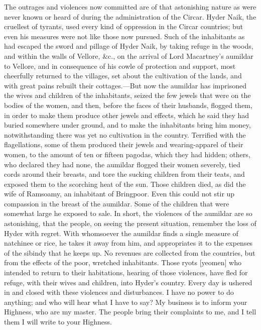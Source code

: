 The outrages and violences now committed are of that astonishing nature as were never known or heard of during the administration of the Circar. Hyder Naik, the cruellest of tyrants, used every kind of oppression in the Circar countries; but even his measures were not like those now pursued. Such of the inhabitants as had escaped the sword and pillage of Hyder Naik, by taking refuge in the woods, and within the walls of Vellore, \&c., on the arrival of Lord Macartney's aumildar to Vellore, and in consequence of his cowle of protection and support, most cheerfully returned to the villages, set about the cultivation of the lands, and with great pains rebuilt their cottages.—But now the aumildar has imprisoned the wives and children of the inhabitants, seized the few jewels that were on the bodies of the women, and then, before the faces of their husbands, flogged them, in order to make them produce other jewels and effects, which he said they had buried somewhere under ground, and to make the inhabitants bring him money, notwithstanding there was yet no cultivation in the country. Terrified with the flagellations, some of them produced their jewels and wearing-apparel of their women, to the amount of ten or fifteen pagodas, which they had hidden; others, who declared they had none, the aumildar flogged their women severely, tied cords around their breasts, and tore the sucking children from their teats, and exposed them to the scorching heat of the sun. Those children died, as did the wife of Ramsoamy, an inhabitant of Bringpoor. Even this could not stir up compassion in the breast of the aumildar. Some of the children that were somewhat large he exposed to sale. In short, the violences of the aumildar are so astonishing, that the people, on seeing the present situation, remember the loss of Hyder with regret. With whomsoever the aumildar finds a single measure of natchinee or rice, he takes it away from him, and appropriates it to the expenses of the sibindy that he keeps up. No revenues are collected from the countries, but from the effects of the poor, wretched inhabitants. Those ryots [yeomen] who intended to return to their habitations, hearing of those violences, have fled for refuge, with their wives and children, into Hyder's country. Every day is ushered in and closed with these violences and disturbances. I have no power to do anything; and who will hear what I have to say? My business is to inform your Highness, who are my master. The people bring their complaints to me, and I tell them I will write to your Highness.
